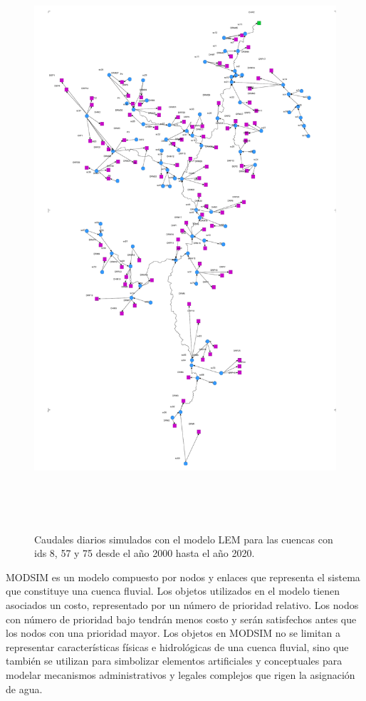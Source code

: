\begin{figure}[h!]
    \begin{center}
      \includegraphics[height=8.5in]{Figures/modzim/figs.png}
      \caption{ Caudales diarios simulados con el modelo LEM para las cuencas con ids 8, 57 y 75 desde el año 2000 hasta
      el año 2020. }
      \label{caudales}
    \end{center}
  \end{figure}

  MODSIM es un modelo compuesto por nodos y enlaces que representa el sistema que constituye una cuenca fluvial. 
  Los objetos utilizados en el modelo tienen asociados un costo, representado por un número de prioridad relativo. 
  Los nodos con número de prioridad bajo tendrán menos costo y serán satisfechos antes que los nodos con una prioridad
  mayor. Los objetos en MODSIM no se limitan a representar características físicas e hidrológicas de una cuenca 
  fluvial, sino que también se utilizan para simbolizar elementos artificiales y conceptuales para modelar mecanismos
   administrativos y legales complejos que rigen la asignación de agua. 

